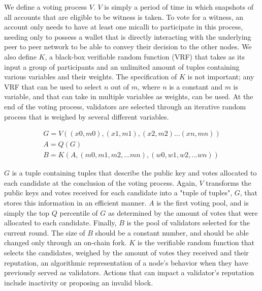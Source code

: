 \documentclass[conference]{IEEEtran}
\begin{document}
We define a voting process $V$. $V$ is simply a period of time in which snapshots of all accounts that are eligible to be witness is taken. To vote for a witness, an account only needs to have at least one micalli to participate in this process, needing only to possess a wallet that is directly interacting with the underlying peer to peer network to be able to convey their decision to the other nodes. We also define $K$, a black-box verifiable random function (VRF) that takes as its input a group of participants and an unlimited amount of tuples containing various variables and their weights. The specification of $K$ is not important; any VRF that can be used to select $n$ out of $m$, where $n$ is a constant and $m$ is variable, and that can take in multiple variables as weights, can be used.  At the end of the voting process, validators are selected through an iterative random process that is weighed by several different variables. 

\begin{eqnarray}
G = V((x0,m0),(x1,m1),(x2,m2)...(xn,mn))\\
A = Q(G)\\
B = K(A, (m0,m1,m2,...mn), (w0,w1,w2,...wn))
\end{eqnarray}

$G$ is a tuple containing tuples that describe the public key and votes allocated to each candidate at the conclusion of the voting process. Again, $V$ transforms the public keys and votes received for each candidate into a "tuple of tuples", $G$, that stores this information in an efficient manner. $A$ is the first voting pool, and is simply the top $Q$ percentile of $G$ as determined by the amount of votes that were allocated to each candidate. Finally, $B$ is the pool of validators selected for the current round. The size of $B$ should be a constant number, and should be able changed only through an on-chain fork. $K$ is the verifiable random function that selects the candidates, weighed by the amount of votes they received and their reputation, an algorithmic representation of a node's behavior when they have previously served as validators. Actions that can impact a validator's reputation include inactivity or proposing an invalid block.
\end{document}
